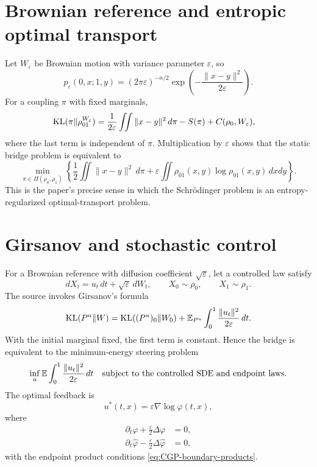 \section{Brownian reference and entropic optimal transport}
Let $W_\varepsilon$ be Brownian motion with variance parameter $\varepsilon$, so
\[
 p_\varepsilon(0,x;1,y)
 =(2\pi\varepsilon)^{-n/2}
 \exp\left(-\frac{\|x-y\|^2}{2\varepsilon}\right).
\]
For a coupling $\pi$ with fixed marginals,
\begin{align*}
 \mathrm{KL}(\pi\|\rho^{W_\varepsilon}_{01})
 &=\frac1{2\varepsilon}\iint\|x-y\|^2\,d\pi
   -S(\pi)+C(\rho_0,W_\varepsilon),
\end{align*}
where the last term is independent of $\pi$.  Multiplication by $\varepsilon$ shows that the static
bridge problem is equivalent to
\begin{equation}
 \min_{\pi\in\Pi(\rho_0,\rho_1)}
 \left\{\frac12\iint\|x-y\|^2\,d\pi
 +\varepsilon\iint \rho_{01}(x,y)\log\rho_{01}(x,y)\,dxdy\right\}.
 \label{eq:CGP-regOT}
\end{equation}
This is the paper's precise sense in which the Schr\"odinger problem is an entropy-regularized
optimal-transport problem.

\section{Girsanov and stochastic control}
For a Brownian reference with diffusion coefficient $\sqrt\varepsilon$, let a controlled law satisfy
\[
 dX_t=u_t\,dt+\sqrt\varepsilon\,dW_t,
 \qquad X_0\sim\rho_0,
 \qquad X_1\sim\rho_1.
\]
The source invokes Girsanov's formula~\cite{Girsanov1960,KaratzasShreve1988}
\begin{equation}
 \mathrm{KL}(P^u\|W)
 =\mathrm{KL}((P^u)_0\|W_0)
 +\mathbb{E}_{P^u}\int_0^1\frac{\|u_t\|^2}{2\varepsilon}\,dt.
 \label{eq:CGP-girsanov}
\end{equation}
With the initial marginal fixed, the first term is constant.  Hence the bridge is equivalent to the
minimum-energy steering problem
\begin{equation}
 \inf_u\mathbb{E}\int_0^1\frac{\|u_t\|^2}{2\varepsilon}\,dt
 \quad\text{subject to the controlled SDE and endpoint laws.}
 \label{eq:CGP-stoch-control}
\end{equation}
The optimal feedback is
\begin{equation}
 u^*(t,x)=\varepsilon\nabla\log\varphi(t,x),
 \label{eq:CGP-brownian-feedback}
\end{equation}
where
\begin{align*}
 \partial_t\varphi+\frac\varepsilon2\Delta\varphi&=0,\\
 \partial_t\widehat\varphi-\frac\varepsilon2\Delta\widehat\varphi&=0,
\end{align*}
with the endpoint product conditions \eqref{eq:CGP-boundary-products}.

